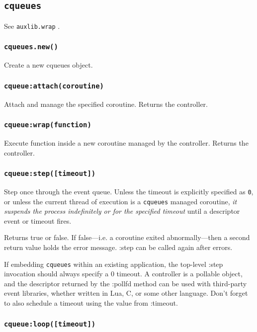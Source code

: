 \documentclass[11pt, oneside]{memoir}
\newcommand{\cqueues}[0]{\texttt{cqueues} }
\newcommand{\routine}[1]{\texttt{#1} }
\newcommand{\fn}[1]{\texttt{#1} }
\newcounter{toccols}
\newenvironment{Module}[1]{
	\subsection{\texttt{#1}}
	\addtocontents{toc}{
		\protect\begin{multicols}{\value{toccols}}
	}
}{
	\addtocontents{toc}{\protect\end{multicols}}
}
\begin{document}
\begin{Module}{\cqueues}
See \fn{auxlib.wrap}.

\subsubsection[\routine{cqueues.new}]{\routine{cqueues.new()}}
Create a new cqueues object.

\subsubsection[\routine{cqueues:attach}]{\routine{cqueue:attach(coroutine)}}
Attach and manage the specified coroutine. Returns the controller.

\subsubsection[\routine{cqueues:wrap}]{\routine{cqueue:wrap(function)}}
Execute function inside a new coroutine managed by the controller. Returns the controller.

\subsubsection[\routine{cqueues:step}]{\routine{cqueue:step([timeout])}}
Step once through the event queue. Unless the timeout is explicitly specified as \texttt{0}, or unless the current thread of execution is a \cqueues managed coroutine, \emph{it suspends the process indefinitely or for the specified timeout} until a descriptor event or timeout fires.

Returns true or false. If false---i.e. a coroutine exited abnormally---then a second return value holds the error message. :step can be called again after errors.

If embedding \cqueues within an existing application, the top-level :step invocation should always specify a 0 timeout. A controller is a pollable object, and the descriptor returned by the :pollfd method can be used with third-party event libraries, whether written in Lua, C, or some other language. Don't forget to also schedule a timeout using the value from :timeout.


\subsubsection[\routine{cqueues:loop}]{\routine{cqueue:loop([timeout])}}


\end{Module}
\end{document}
